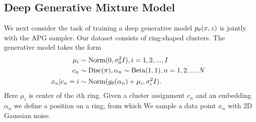 \documentclass{article}
\theoremstyle{definition}
\begin{document}
\subsection{Deep Generative Mixture Model}
We next consider the task of training a deep generative model $p_\theta(x, z)$ is jointly with the APG sampler. Our dataset consists of ring-shaped clusters. The generative model takes the form
\begin{align*}
    \mu_i &\sim \text{Norm}(0, 
    \sigma_0^2 I), 
    i = 1, 2, ..., I \\
    c_n &\sim \mathrm{Disc}(\pi), \alpha_n \sim \text{Beta}(1, 1), n = 1, 2, ..., N \\
    x_n | c_n=i &\sim \text{Norm}(g_\theta(\alpha_n) + \mu_i, \sigma^2_{\epsilon} I).
\end{align*}
Here $\mu_i$ is center of the $i$th ring. Given a cluster assignment $c_n$ and an embedding $\alpha_n$ we define a position on a ring, from which We sample a data point $x_n$ with 2D Gaussian noise.



     
\end{document}
